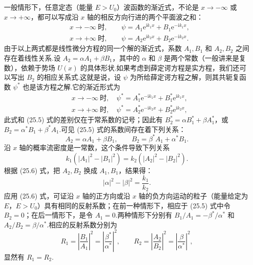 一般情形下，任意定态（能量 $E>U_0$）波函数的渐近式，不论是 $x\to-\infty$ 或 $x\to+\infty$，都可以写成沿 $x$ 轴的相反方向行进的两个平面波之和：
\begin{equation}
\begin{aligned}
  &x\to-\infty\ \text{时},\qquad
  \psi=A_1\mathrm{e}^{\mathrm{i}k_1x}+B_1\mathrm{e}^{-\mathrm{i}k_1x},\\
  &x\to+\infty\ \text{时},\qquad
  \psi=A_2\mathrm{e}^{\mathrm{i}k_2x}+B_2\mathrm{e}^{-\mathrm{i}k_2x}.
\end{aligned}
\end{equation}
由于以上两式都是线性微分方程的同一个解的渐近式，系数 $A_1,B_1$ 和 $A_2,B_2$ 之间存在着线性关系.设 $A_2=\alpha A_1+\beta B_1$，其中的 $\alpha$ 和 $\beta$ 是两个常数（一般讲来是复数），依赖于势场 $U(x)$ 的具体形状.如果考虑到薛定谔方程是实方程，我们还可以写出 $B_2$ 的相应关系式.这就是说，设 $\psi$ 为所给薛定谔方程之解，则其共轭复函数 $\psi^*$ 也是该方程之解.它的渐近形式为
\begin{equation*}
\begin{aligned}
  &x\to-\infty\ \text{时},\quad
  \psi^*=A_1^*\mathrm{e}^{-\mathrm{i}k_1x}+B_1^*\mathrm{e}^{\mathrm{i}k_1x},\\
  &x\to+\infty\ \text{时},\quad
  \psi^*=A_2^*\mathrm{e}^{-\mathrm{i}k_2x}+B_2^*\mathrm{e}^{\mathrm{i}k_2x},
\end{aligned}
\end{equation*}
此式和 (25.5) 式的差别仅在于常系数的记号；因此有
$B_2^*=\alpha B_1^*+\beta A_1^*$，或 $B_2=\alpha^*B_1+\beta^*A_1$.可见 (25.5) 式的系数间存在着下列关系：
\begin{equation}
  A_2=\alpha A_1+\beta B_1,
  \qquad
  B_2=\beta^* A_1+\alpha^* B_1.
\end{equation}
沿 $x$ 轴的概率流密度是一常数，这个条件导致下列关系
\begin{equation*}
  k_1\left(|A_1|^2-|B_1|^2\right)
  =k_2\left(|A_2|^2-|B_2|^2\right).
\end{equation*}
根据 (25.6) 式，把 $A_2,B_2$ 换成 $A_1,B_1$，结果得：
\begin{equation}
  |\alpha|^2-|\beta|^2=\frac{k_1}{k_2}.
\end{equation}
应用 (25.6) 式，可证沿 $x$ 轴的正方向或沿 $x$ 轴的负方向运动的粒子（能量给定为 $E$，$E>U_0$）具有相同的反射系数；在前一种情形下，相应于 (25.5) 式中令 $B_2=0$；在后一情形下，是令 $A_1=0$.两种情形下分别有
$B_1/A_1=-\beta^*/\alpha^*$ 和 $A_2/B_2=\beta/\alpha^*$.相应的反射系数分别为
\begin{equation*}
  R_1=\left|\frac{B_1}{A_1}\right|^2
  =\left|\frac{\beta^*}{\alpha^*}\right|^2,
  \qquad
  R_2=\left|\frac{A_2}{B_2}\right|^2
  =\left|\frac{\beta}{\alpha^*}\right|^2,
\end{equation*}
显然有 $R_1=R_2$.

